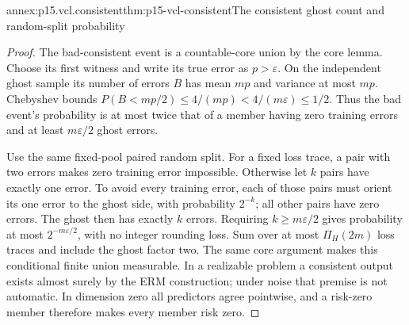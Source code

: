 \begin{annexitem}{annex:p15.vcl.consistent}{thm:p15-vcl-consistent}{The consistent ghost count and random-split probability}
\begin{proof}
The bad-consistent event is a countable-core union by the core lemma.
Choose its first witness and write its true error as \(p>\varepsilon\).
On the independent ghost sample its number of errors \(B\) has mean
\(mp\) and variance at most \(mp\). Chebyshev bounds
\(P(B<mp/2)\leq4/(mp)<4/(m\varepsilon)\leq1/2\).
Thus the bad event's probability is at most twice that of a member
having zero training errors and at least \(m\varepsilon/2\) ghost errors.

Use the same fixed-pool paired random split. For a fixed loss trace,
a pair with two errors makes zero training error impossible. Otherwise
let \(k\) pairs have exactly one error. To avoid every training error,
each of those pairs must orient its one error to the ghost side, with
probability \(2^{-k}\); all other pairs have zero errors. The ghost
then has exactly \(k\) errors. Requiring \(k\geq m\varepsilon/2\)
gives probability at most \(2^{-m\varepsilon/2}\), with no integer
rounding loss. Sum over at most \(\Pi_H(2m)\) loss traces and include
the ghost factor two. The same core argument makes this conditional
finite union measurable. In a realizable problem a consistent output
exists almost surely by the ERM construction; under noise that premise
is not automatic. In dimension zero all predictors agree pointwise,
and a risk-zero member therefore makes every member risk zero.
\end{proof}
\end{annexitem}

